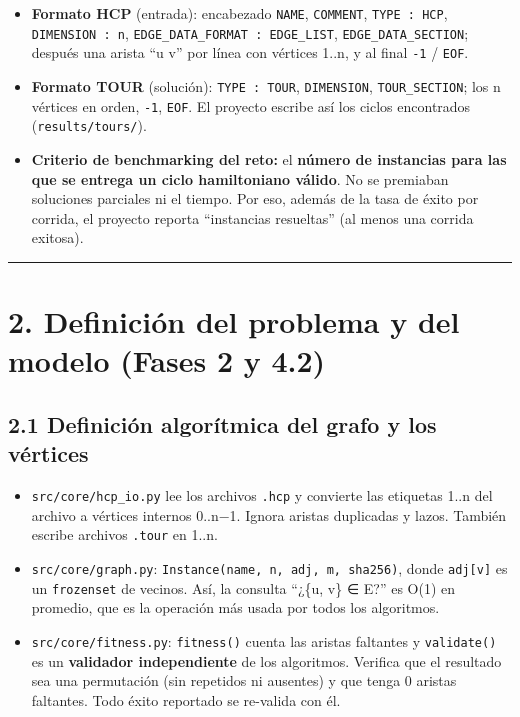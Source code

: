 \documentclass[
  spanish,
  11pt,
]{article}
\providecommand{\tightlist}{%
  \setlength{\itemsep}{0pt}\setlength{\parskip}{0pt}}
\begin{document}
\begin{itemize}
\tightlist
\item
  \textbf{Formato HCP} (entrada): encabezado \texttt{NAME},
  \texttt{COMMENT}, \texttt{TYPE\ :\ HCP}, \texttt{DIMENSION\ :\ n},
  \texttt{EDGE\_DATA\_FORMAT\ :\ EDGE\_LIST},
  \texttt{EDGE\_DATA\_SECTION}; después una arista ``u v'' por línea con
  vértices 1..n, y al final \texttt{-1} / \texttt{EOF}.
\item
  \textbf{Formato TOUR} (solución): \texttt{TYPE\ :\ TOUR},
  \texttt{DIMENSION}, \texttt{TOUR\_SECTION}; los n vértices en orden,
  \texttt{-1}, \texttt{EOF}. El proyecto escribe así los ciclos
  encontrados (\texttt{results/tours/}).
\item
  \textbf{Criterio de benchmarking del reto:} el \textbf{número de
  instancias para las que se entrega un ciclo hamiltoniano válido}. No
  se premiaban soluciones parciales ni el tiempo. Por eso, además de la
  tasa de éxito por corrida, el proyecto reporta ``instancias
  resueltas'' (al menos una corrida exitosa).
\end{itemize}

\begin{center}\rule{0.5\linewidth}{0.5pt}\end{center}

\section{2. Definición del problema y del modelo (Fases 2 y
4.2)}\label{definiciuxf3n-del-problema-y-del-modelo-fases-2-y-4.2}

\subsection{2.1 Definición algorítmica del grafo y los
vértices}\label{definiciuxf3n-algoruxedtmica-del-grafo-y-los-vuxe9rtices}

\begin{itemize}
\tightlist
\item
  \texttt{src/core/hcp\_io.py} lee los archivos \texttt{.hcp} y
  convierte las etiquetas 1..n del archivo a vértices internos 0..n−1.
  Ignora aristas duplicadas y lazos. También escribe archivos
  \texttt{.tour} en 1..n.
\item
  \texttt{src/core/graph.py}:
  \texttt{Instance(name,\ n,\ adj,\ m,\ sha256)}, donde
  \texttt{adj{[}v{]}} es un \texttt{frozenset} de vecinos. Así, la
  consulta ``¿\{u, v\} ∈ E?'' es O(1) en promedio, que es la operación
  más usada por todos los algoritmos.
\item
  \texttt{src/core/fitness.py}: \texttt{fitness()} cuenta las aristas
  faltantes y \texttt{validate()} es un \textbf{validador independiente}
  de los algoritmos. Verifica que el resultado sea una permutación (sin
  repetidos ni ausentes) y que tenga 0 aristas faltantes. Todo éxito
  reportado se re-valida con él.
\end{itemize}
\end{document}
